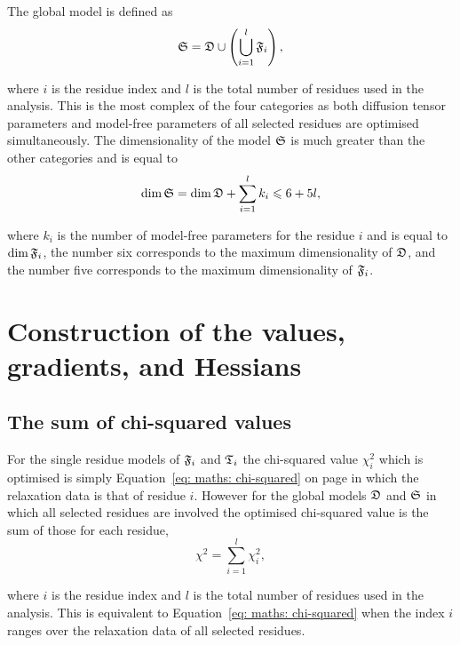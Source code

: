 The global model is defined as
\begin{equation}
    \mathfrak{S} = \mathfrak{D} \cup \left( \bigcup_{i=1}^l \mathfrak{F}_i \right),
\end{equation}

\noindent where $i$ is the residue index and $l$ is the total number of residues used in the analysis.
This is the most complex of the four categories as both diffusion tensor parameters and model-free parameters of all selected residues are optimised simultaneously.
The dimensionality of the model $\mathfrak{S}$ is much greater than the other categories and is equal to
\begin{equation}
    \dim \mathfrak{S} = \dim \mathfrak{D} + \sum_{i=1}^l k_i \leqslant 6 + 5l,
\end{equation}

\noindent where $k_i$ is the number of model-free parameters for the residue $i$ and is equal to $\dim \mathfrak{F}_i$, the number six corresponds to the maximum dimensionality of $\mathfrak{D}$, and the number five corresponds to the maximum dimensionality of $\mathfrak{F}_i$.





\section{Construction of the values, gradients, and Hessians}



\subsection{The sum of chi-squared values}

For the single residue models of $\mathfrak{F}_i$ and $\mathfrak{T}_i$ the chi-squared value $\chi^2_i$ which is optimised is simply Equation~\eqref{eq: maths: chi-squared} on page \pageref{eq: maths: chi-squared} in which the relaxation data is that of residue $i$.
However for the global models $\mathfrak{D}$ and $\mathfrak{S}$ in which all selected residues are involved the optimised chi-squared value is the sum of those for each residue,
\begin{equation}
    \chi^2 = \sum^l_{i=1} \chi^2_i,
\end{equation}

\noindent where $i$ is the residue index and $l$ is the total number of residues used in the analysis.
This is equivalent to Equation~\eqref{eq: maths: chi-squared} when the index $i$ ranges over the relaxation data of all selected residues.




